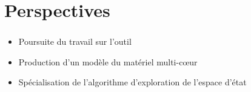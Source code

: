 \documentclass{beamer}
\begin{document}
  \section{Perspectives}
  \begin{frame}
    \frametitle{\secname}

    \begin{itemize}
      \item Poursuite du travail sur l'outil
      \item Production d'un modèle du matériel multi-c{\oe}ur
      \item Spécialisation de l'algorithme d'exploration de l'espace d'état
    \end{itemize}
  \end{frame}
\end{document}
